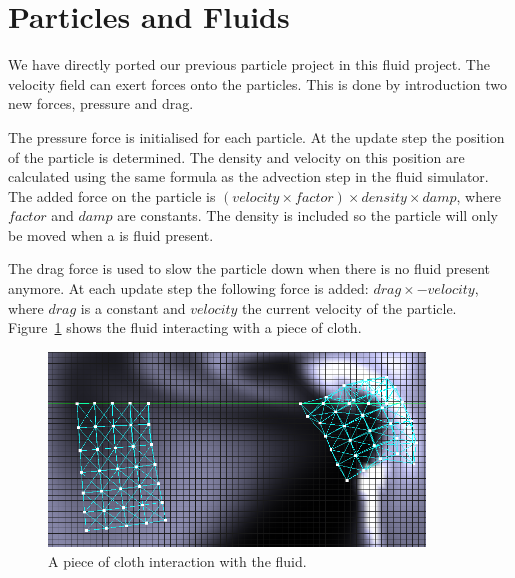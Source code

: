 \section{Particles and Fluids}
We have directly ported our previous particle project in this fluid project.
The velocity field can exert forces onto the particles.
This is done by introduction two new forces, pressure and drag.

\noindent The pressure force is initialised for each particle.
At the update step the position of the particle is determined.
The density and velocity on this position are calculated using the same formula as the advection step in the fluid simulator.
The added force on the particle is $(velocity \times factor) \times density \times damp$, where $factor$ and $damp$ are constants.
The density is included so the particle will only be moved when a is fluid present.

\noindent The drag force is used to slow the particle down when there is no fluid present anymore.
At each update step the following force is added: $drag \times -velocity$, where $drag$ is a constant and $velocity$ the current velocity of the particle.\\
Figure~\ref{fig:cloth} shows the fluid interacting with a piece of cloth.

\begin{figure}[h]
    \centering
    \includegraphics[width=10cm]{img/cloth.png}
    \caption{A piece of cloth interaction with the fluid.}
    \label{fig:cloth}
\end{figure}
